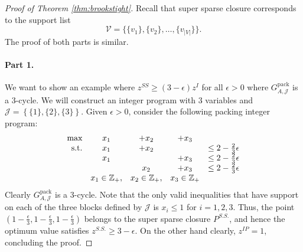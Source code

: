 \documentclass[smallextended]{svjour3}
\begin{document}
\begin{proof}[Proof of Theorem \ref{thm:brookstight}] 
Recall that super sparse closure corresponds to the support list $$\mathcal{V} = \{\{v_1\}, \{v_2\}, \dots, \{v_{|V|}\}\}.$$
The proof of both parts is similar. 

	\paragraph{Part 1.} 
	We want to show an example where $z^{SS} \geq (3 - \epsilon) z^I$ for all $\epsilon >0$ where ${G^{\textrm{pack}}_{A, {\mathcal{J}}}}$ is a 3-cycle. We will construct an integer program with $3$ variables and $\mathcal{J} = \left\{\{1\}, \{2\}, \{3\}\right\}$. Given $\epsilon > 0$, consider the following packing integer program:
\begin{eqnarray}
\begin{array}{rcccl}
\textup{max}& x_1 &+ x_2 &+ x_3& \\
\textup{s.t.}& x_1 &+ x_2& &\leq 2 - \frac{2}{3}\epsilon \\
&x_1 & &+ x_3 &\leq 2 - \frac{2}{3}\epsilon \\
&&x_2 &+ x_3& \leq 2 - \frac{2}{3}\epsilon \\
&x_1 \in \mathbb{Z}_{+},&x_2 \in \mathbb{Z}_{+},& x_3 \in \mathbb{Z}_{+} 
\end{array}
\end{eqnarray}
Clearly ${G^{\textrm{pack}}_{A, {\mathcal{J}}}}$ is a 3-cycle. 
Note that the only valid inequalities that have support on each of the three blocks defined by ${\mathcal{J}}$ is $x_i \leq 1$ for $i =1,2,3$. Thus, the point $(1 - \frac{\epsilon}{3}, 1 - \frac{\epsilon}{3}, 1 - \frac{\epsilon}{3})$ belongs to the super sparse closure $P^{S.S.}$, and hence the optimum value satisfies $z^{S.S.} \geq 3 - \epsilon$. On the other hand clearly, $z^{IP} = 1$, concluding the proof.


\end{proof}
\end{document}
